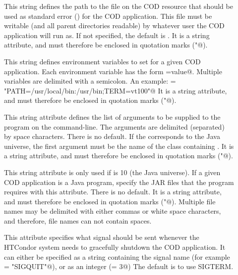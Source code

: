 \begin{description}
 \item[] This string defines the path to the file on the
   COD resource that should be used as standard error ()
   for the COD application.
   This file must be writable (and all parent directories readable) by
   whatever user the COD application will run as.
   If not specified, the default is .
   It is a string attribute, and must therefore be enclosed in 
   quotation marks (\verb@"@).

 \item[] This string defines environment variables to
   set for a given COD application.
   Each environment variable has the form \verb@NAME=value@.
   Multiple variables are delimited with a semicolon.
   An example: \verb@Env = "PATH=/usr/local/bin:/usr/bin;TERM=vt100"@ 
   It is a string attribute, and must therefore be enclosed in 
   quotation marks (\verb@"@).

 \item[] This string attribute defines the list of
   arguments to be supplied to the program on the command-line.
   The arguments are delimited (separated) by space characters. 
   There is no default. 
   If the  corresponds to the Java
   universe, the first argument must be the name of the class
   containing .
   It is a string attribute, and must therefore be enclosed in 
   quotation marks (\verb@"@).

 \item[] This string attribute is only used if
    is 10 (the Java universe).
   If a given COD application is a Java program, specify the
   JAR files that the program requires with this attribute.
   There is no default.
   It is a string attribute, and must therefore be enclosed in 
   quotation marks (\verb@"@).
   Multiple file names may be delimited with either commas or white space
   characters, and
   therefore, file names can not contain spaces.

 \item[] This attribute specifies what signal should be
   sent whenever the HTCondor system needs to gracefully shutdown the
   COD application.
   It can either be specified as a string containing the signal name
   (for example \verb@KillSig = "SIGQUIT"@), or as an integer
   (\verb@KillSig = 3@)
   The default is to use SIGTERM.


\end{description}
